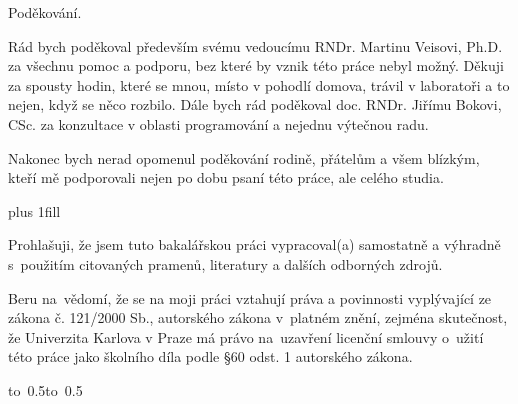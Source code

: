 \documentclass[12pt,a4paper]{report}
\let\openright=\clearpage
\begin{document}
\newpage



\openright

\noindent
Poděkování.

Rád bych poděkoval především svému vedoucímu RNDr. Martinu Veisovi, Ph.D. za všechnu pomoc a podporu, bez které by vznik této práce nebyl možný. 
Děkuji za spousty hodin, které se mnou, místo v pohodlí domova, trávil v laboratoři a to nejen, když se něco rozbilo.
Dále bych rád poděkoval doc. RNDr. Jiřímu Bokovi, CSc. za konzultace v oblasti programování a nejednu výtečnou radu.

Nakonec bych nerad opomenul poděkování rodině, přátelům a všem blízkým, kteří mě podporovali nejen po dobu psaní této práce, ale celého studia.

\newpage


\vglue 0pt plus 1fill

\noindent
Prohlašuji, že jsem tuto bakalářskou práci vypracoval(a) samostatně a výhradně
s~použitím citovaných pramenů, literatury a dalších odborných zdrojů.

\medskip\noindent
Beru na~vědomí, že se na moji práci vztahují práva a povinnosti vyplývající
ze zákona č. 121/2000 Sb., autorského zákona v~platném znění, zejména skutečnost,
že Univerzita Karlova v Praze má právo na~uzavření licenční smlouvy o~užití této
práce jako školního díla podle §60 odst. 1 autorského zákona.

\vspace{10mm}

\hbox{\hbox to 0.5\hbox to 0.5}

\vspace{20mm}
\newpage

\end{document}
